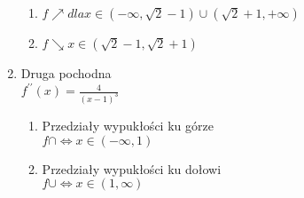 \documentclass[11pt]{scrartcl}
\begin{document}
\begin{enumerate}
			\begin{enumerate}
				\item $ f\nearrow dla x \in (-\infty, \sqrt{2} -1) \cup (\sqrt{2} +1, +\infty) $
				\item $ f\searrow x \in ( \sqrt{2} - 1, \sqrt{2} +1 ) $
			\end{enumerate}
		\item Druga pochodna \\
			$ f^{\prime\prime}(x) = \frac{4}{(x-1)^3} $
			\begin{enumerate}
				\item Przedziały wypukłości ku górze \\
				$ f\cap \Leftrightarrow x \in (-\infty, 1) $
				\item Przedziały wypukłości ku dołowi \\
				$ f\cup \Leftrightarrow x \in (1,\infty) $
			\end{enumerate}
	\end{enumerate}
	
\end{document}
